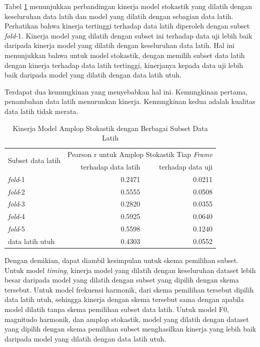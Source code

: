 Tabel \ref{tab-stoc-model-subset-results} menunjukkan perbandingan kinerja model stokastik yang dilatih dengan keseluruhan data latih dan model yang dilatih dengan sebagian data latih. Perhatikan bahwa kinerja tertinggi terhadap data latih diperoleh dengan subset \textit{fold}-1. Kinerja model yang dilatih dengan subset ini terhadap data uji lebih baik daripada kinerja model yang dilatih dengan keseluruhan data latih. Hal ini menunjukkan bahwa untuk model stokastik, dengan memilih subset data latih dengan kinerja terhadap data latih tertinggi, kinerjanya kepada data uji lebih baik daripada model yang dilatih dengan data latih utuh. 

Terdapat dua kemungkinan yang menyebabkan hal ini. Kemungkinan pertama, penambahan data latih menurunkan kinerja. Kemungkinan kedua adalah kualitas data latih tidak merata.

\begin{table}[htbp]
    \centering
    \caption{Kinerja Model Amplop Stokastik dengan Berbagai Subset Data Latih}\label{tab-stoc-model-subset-results}
    \begin{tabular}{ |l|r|r| } 
     \hline
     \multirow{2}{*}{Subset data latih} & \multicolumn{2}{l|}{Pearson r untuk Amplop Stokastik Tiap \textit{Frame}} \\
     \cline{2-3}
     & terhadap data latih & terhadap data uji \\\hline
	\textit{fold}-1       &0.2471  &0.0211\\\hline
	\textit{fold}-2       &0.5555  &0.0508\\\hline
	\textit{fold}-3       &0.2820  &0.0355\\\hline
	\textit{fold}-4       &0.5925  &0.0640\\\hline
	\textit{fold}-5       &0.5598  &0.1240\\\hline
	data latih utuh       &0.4303  &0.0552\\\hline
    \end{tabular}
\end{table}

Dengan demikian, dapat diambil kesimpulan untuk skema pemilihan subset. Untuk model \textit{timing}, kinerja model yang dilatih dengan keseluruhan dataset lebih besar daripada model yang dilatih dengan subset yang dipilih dengan skema tersebut. Untuk model frekuensi harmonik, dari skema pemilihan tersebut dipilih data latih utuh, sehingga kinerja dengan skema tersebut sama dengan apabila model dilatih tanpa skema pemilihan subset data latih. Untuk model F0, magnitudo harmonik, dan amplop stokastik, model yang dilatih dengan dataset yang dipilih dengan skema pemilihan subset menghasilkan kinerja yang lebih baik daripada model yang dilatih dengan data latih utuh.

